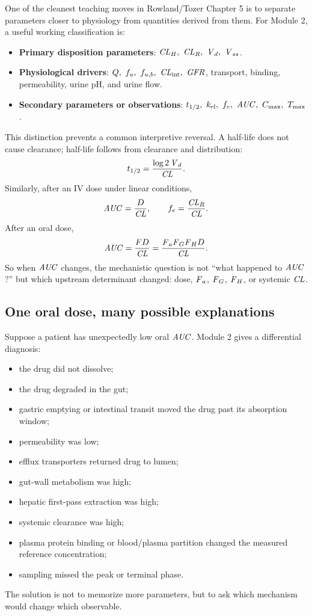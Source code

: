\documentclass[a4paper]{article}
\newcommand{\CL}{\ensuremath{\pksym{CL}}}
\newcommand{\CLR}{\ensuremath{\pksym{CL}_{R}}}
\newcommand{\CLH}{\ensuremath{\pksym{CL}_{H}}}
\newcommand{\CLint}{\ensuremath{\pksym{CL}_{\pklab{int}}}}
\newcommand{\Vd}{\ensuremath{\pksym{V}_d}}
\newcommand{\Vss}{\ensuremath{\pksym{V}_{ss}}}
\newcommand{\AUC}{\ensuremath{\pksym{AUC}}}
\newcommand{\Cmax}{\ensuremath{C_{\pklab{max}}}}
\newcommand{\Tmax}{\ensuremath{T_{\pklab{max}}}}
\newcommand{\Fa}{\ensuremath{\pksym{F}_a}}
\newcommand{\Fg}{\ensuremath{\pksym{F}_G}}
\newcommand{\Fh}{\ensuremath{\pksym{F}_H}}
\newcommand{\Fbio}{\ensuremath{F}}
\newcommand{\fu}{\ensuremath{f_u}}
\newcommand{\fub}{\ensuremath{f_{u,b}}}
\newcommand{\GFR}{\ensuremath{\pksym{GFR}}}
\newcommand{\kel}{\ensuremath{k_{\pklab{el}}}}
\begin{document}
One of the cleanest teaching moves in Rowland/Tozer Chapter 5 is to separate parameters closer to physiology from quantities derived from them. For Module 2, a useful working classification is:
\begin{itemize}[leftmargin=2em]
  \item \textbf{Primary disposition parameters}: \(\CLH,\ \CLR,\ \Vd,\ \Vss\).
  \item \textbf{Physiological drivers}: \(Q,\ \fu,\ \fub,\ \CLint,\ \GFR\), transport, binding, permeability, urine pH, and urine flow.
  \item \textbf{Secondary parameters or observations}: \(t_{1/2},\ \kel,\ f_e,\ \AUC,\ \Cmax,\ \Tmax\).
\end{itemize}
This distinction prevents a common interpretive reversal. A half-life does not cause clearance; half-life follows from clearance and distribution:
\[
  t_{1/2}
  =
  \frac{\log 2\,\Vd}{\CL}.
\]
Similarly, after an IV dose under linear conditions,
\[
  \AUC=\frac{D}{\CL},
  \qquad
  f_e=\frac{\CLR}{\CL}.
\]
After an oral dose,
\[
  \AUC=\frac{\Fbio D}{\CL}
  =
  \frac{\Fa\Fg\Fh D}{\CL}.
\]
So when \(\AUC\) changes, the mechanistic question is not ``what happened to \(\AUC\)?'' but which upstream determinant changed: dose, \(\Fa\), \(\Fg\), \(\Fh\), or systemic \(\CL\).

\subsection{One oral dose, many possible explanations}

Suppose a patient has unexpectedly low oral \(\AUC\). Module 2 gives a differential diagnosis:
\begin{itemize}[leftmargin=2em]
  \item the drug did not dissolve;
  \item the drug degraded in the gut;
  \item gastric emptying or intestinal transit moved the drug past its absorption window;
  \item permeability was low;
  \item efflux transporters returned drug to lumen;
  \item gut-wall metabolism was high;
  \item hepatic first-pass extraction was high;
  \item systemic clearance was high;
  \item plasma protein binding or blood/plasma partition changed the measured reference concentration;
  \item sampling missed the peak or terminal phase.
\end{itemize}
The solution is not to memorize more parameters, but to ask which mechanism would change which observable.
\end{document}
